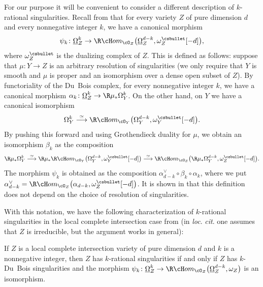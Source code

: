 For our purpose it will be convenient to consider a different description of $k$-rational singularities. Recall from
\cite[\S 6]{MP2} that for every variety $Z$ of pure dimension $d$ and every nonnegative integer $k$, we have a canonical morphism\vspace*{-3pt}
\begin{equation}\label{eq_can1}
\psi_k\colon \underline{\Omega}_Z^k\to \R\cH om_{\cO_Z}\big(\underline{\Omega}_Z^{d-k},\omega_Z^{\csbullet}[-d]\big),
\end{equation}
where $\omega_Z^{\csbullet}$ is the dualizing complex of $Z$. This is defined as follows: suppose that $\mu\colon Y\to Z$
is an arbitrary resolution of singularities (we only require that $Y$ is smooth and $\mu$ is proper and an isomorphism
over a dense open subset of $Z$). By functoriality of the Du~Bois complex, for every nonnegative integer $k$, we have a canonical morphism
$\alpha_k\colon\underline{\Omega}_Z^k\to \R\mu_*\Omega_Y^k$. On the other hand, on $Y$ we have a canonical isomorphism\vspace*{-3pt}
\[\Omega_Y^k\overset{\simeq}\longrightarrow \R\cH om_{\cO_Y}\big(\Omega_Y^{d-k},\omega_Y^{\csbullet}[-d]\big).\]
By pushing this forward and using Grothendieck duality for $\mu$, we obtain an isomorphism $\beta_k$ as the composition\vspace*{-3pt}
\[\R\mu_*\Omega_Y^k\overset{\simeq}\longrightarrow \R\mu_*\R\cH om_{\cO_Y}\big(\Omega_Y^{d-k},\omega_Y^{\csbullet}[-d]\big)\overset{\simeq}\longrightarrow
\R\cH om_{\cO_Z}\big(\R\mu_*\Omega_Y^{d-k},\omega_Z^{\csbullet}[-d]\big).\]
The morphism $\psi_k$ is obtained as the composition $\alpha_{d-k}^{\vee}\circ \beta_k\circ\alpha_k$, where we put
$\alpha_{d-k}^{\vee}=\R\cH om_{\cO_Z}\big(\alpha_{d-k},\omega_Z^{\csbullet}[-d]\big)$.
It is shown in \cite[Prop.\,6.1]{MP2} that this definition does not depend on the choice of resolution of singularities.

With this notation, we have the following characterization of $k$-rational singularities in the local complete intersection case
from \cite{MP2} (in \emph{loc}. \emph{cit}. one assumes that $Z$ is irreducible, but the argument works in general):

\begin{thm}\label{chr_k_rat}
If $Z$ is a local complete intersection variety of pure dimension $d$ and $k$ is a nonnegative integer, then $Z$ has $k$-rational singularities
if and only if $Z$ has $k$-Du~Bois singularities and the morphism $\psi_k\colon \underline{\Omega}_Z^k\to \R\cH om_{\cO_Z}\big(\underline{\Omega}_Z^{d-k},\omega_Z\big)$ is an isomorphism.
\end{thm}

